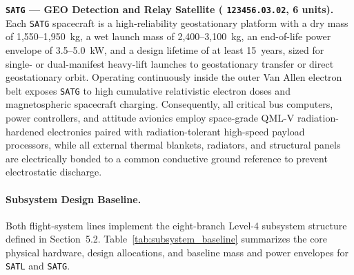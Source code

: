 \textbf{\texttt{SATG} --- GEO Detection and Relay Satellite ( \texttt{123456.03.02}, 6 units).}
Each \texttt{SATG} spacecraft is a high-reliability geostationary platform with a dry mass of 1,550--1,950~kg, a wet launch mass of 2,400--3,100~kg, an end-of-life power envelope of 3.5--5.0~kW, and a design lifetime of at least 15~years, sized for single- or dual-manifest heavy-lift launches to geostationary transfer or direct geostationary orbit. Operating continuously inside the outer Van Allen electron belt exposes \texttt{SATG} to high cumulative relativistic electron doses and magnetospheric spacecraft charging. Consequently, all critical bus computers, power controllers, and attitude avionics employ space-grade QML-V radiation-hardened electronics paired with radiation-tolerant high-speed payload processors, while all external thermal blankets, radiators, and structural panels are electrically bonded to a common conductive ground reference to prevent electrostatic discharge.

\paragraph{Subsystem Design Baseline.}
Both flight-system lines implement the eight-branch Level-4 subsystem structure defined in Section~5.2. Table~\ref{tab:subsystem_baseline} summarizes the core physical hardware, design allocations, and baseline mass and power envelopes for \texttt{SATL} and \texttt{SATG}.

